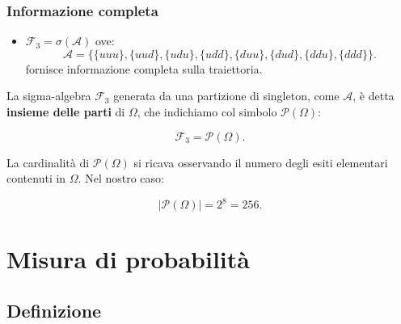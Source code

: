 \documentclass[handout]{beamer}%
\providecommand{\F}{\mathcal{F}}
\providecommand{\1}{\mathbf{1}}
\providecommand{\QTR}[2]{\csname #1\endcsname{#2}}
\begin{document}
\begin{frame}%
%

\frametitle{Informazione completa}%


\begin{itemize}


\item $\F_{3} =\sigma(\mathcal{A})$ ove:
\[
\mathcal{A}%
=\{\{uuu\},\{uud\},\{udu\},\{udd\},\{duu\},\{dud\},\{ddu\},\{ddd\}\}.
\]
fornisce informazione completa sulla traiettoria.
\end{itemize}

\medskip

La sigma-algebra $\F_{3}$ generata da una partizione di singleton, come
$\mathcal{A}$, \`{e} detta \textbf{insieme delle parti} di $\Omega$, che
indichiamo col simbolo $\mathcal{P} (\Omega)$:%

\[
\F_{3}=\mathcal{P}(\Omega).
\]


\medskip

La cardinalit\`{a} di $\mathcal{P}(\Omega)$ si ricava osservando il numero
degli esiti elementari contenuti in $\Omega$. Nel nostro caso:%

\[
|\mathcal{P}(\Omega)|=2^{8}=256.
\]
%

\transboxout
\end{frame}%


\section{Misura di probabilit\`{a}}

\subsection{Definizione}%
\end{document}
